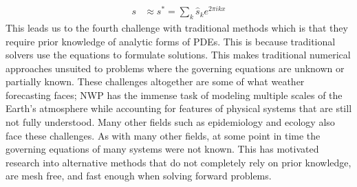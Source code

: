 \begin{align}
    s & \approx s^* = \sum_{k} \hat{s}_k e^{2\pi ikx}\label{eq:fourier_series}
\end{align}
This leads us to the fourth challenge with traditional methods which is that they require prior knowledge of analytic forms of PDEs. This is because traditional solvers use the equations to formulate solutions. This makes traditional numerical approaches unsuited to problems where the governing equations are unknown or partially known. These challenges altogether are some of what weather forecasting faces; NWP has the immense task of modeling multiple scales of the Earth's atmosphere while accounting for features of physical systems that are still not fully understood. Many other fields such as epidemiology \autocite{brauerMathematicalModelsEpidemiology2019} and ecology \autocite{holmesPartialDifferentialEquations1994,turchinDoesPopulationEcology2001} also face these challenges. As with many other fields, at some point in time the governing equations of many systems were not known. This has motivated research into alternative methods that do not completely rely on prior knowledge, are mesh free, and fast enough when solving forward problems.


